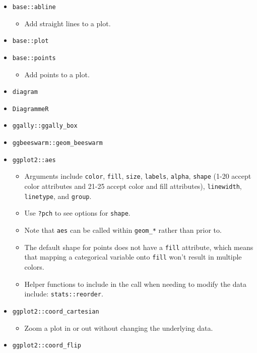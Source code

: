 \documentclass[
]{book}
\providecommand{\tightlist}{%
  \setlength{\itemsep}{0pt}\setlength{\parskip}{0pt}}
\begin{document}
\begin{itemize}
\tightlist
\item
  \texttt{base::abline}

  \begin{itemize}
  \tightlist
  \item
    Add straight lines to a plot.
  \end{itemize}
\item
  \texttt{base::plot}
\item
  \texttt{base::points}

  \begin{itemize}
  \tightlist
  \item
    Add points to a plot.
  \end{itemize}
\item
  \texttt{diagram}
\item
  \texttt{DiagrammeR}
\item
  \texttt{ggally::ggally\_box}
\item
  \texttt{ggbeeswarm::geom\_beeswarm}
\item
  \texttt{ggplot2::aes}

  \begin{itemize}
  \tightlist
  \item
    Arguments include \texttt{color}, \texttt{fill}, \texttt{size}, \texttt{labels}, \texttt{alpha}, \texttt{shape} (1-20 accept color attributes and 21-25 accept color and fill attributes), \texttt{linewidth}, \texttt{linetype}, and \texttt{group}.
  \item
    Use \texttt{?pch} to see options for \texttt{shape}.
  \item
    Note that \texttt{aes} can be called within \texttt{geom\_*} rather than prior to.
  \item
    The default shape for points does not have a \texttt{fill} attribute, which means that mapping a categorical variable onto \texttt{fill} won't result in multiple colors.
  \item
    Helper functions to include in the call when needing to modify the data include: \texttt{stats::reorder}.
  \end{itemize}
\item
  \texttt{ggplot2::coord\_cartesian}

  \begin{itemize}
  \tightlist
  \item
    Zoom a plot in or out without changing the underlying data.
  \end{itemize}
\item
  \texttt{ggplot2::coord\_flip}


\end{itemize}
\end{document}

